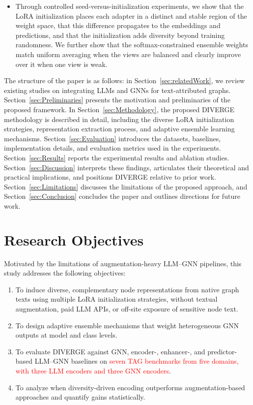 \documentclass[a4paper,fleqn]{cas-sc}
\newcommand{\revone}[1]{\textcolor{red}{#1}}   %
\DeclareRobustCommand{\revcommon}[2][]{\textcolor{revshared}{#2}} %
\begin{document}
\begin{itemize}
	\item \revcommon[R1,R2,R4]{Through controlled seed-versus-initialization experiments, we show that the LoRA initialization places each adapter in a distinct and stable region of the weight space, that this difference propagates to the embeddings and predictions, and that the initialization adds diversity beyond training randomness. We further show that the softmax-constrained ensemble weights match uniform averaging when the views are balanced and clearly improve over it when one view is weak.}
\end{itemize}

The structure of the paper is as follows: in Section~\ref{sec:relatedWork}, we review existing studies on integrating LLMs and GNNs for text-attributed graphs. Section~\ref{sec:Preliminaries} presents the motivation and preliminaries of the proposed framework. In Section~\ref{sec:Methodology}, the proposed DIVERGE methodology is described in detail, including the diverse LoRA initialization strategies, representation extraction process, and adaptive ensemble learning mechanisms. Section~\ref{sec:Evaluation} introduces the datasets, baselines, implementation details, and evaluation metrics used in the experiments. Section~\ref{sec:Results} reports the experimental results and ablation studies. Section~\ref{sec:Discussion} interprets these findings, articulates their theoretical and practical implications, and positions DIVERGE relative to prior work. Section~\ref{sec:Limitations} discusses the limitations of the proposed approach, and Section~\ref{sec:Conclusion} concludes the paper and outlines directions for future work.


\section{Research Objectives}\label{sec:researchObjectives}
Motivated by the limitations of augmentation-heavy LLM--GNN pipelines, this study addresses the following objectives:
\begin{enumerate}
    \item To induce diverse, complementary node representations from native graph texts using multiple LoRA initialization strategies, without textual augmentation, paid LLM APIs, or off-site exposure of sensitive node text.
    \item To design adaptive ensemble mechanisms that weight heterogeneous GNN outputs at model and class levels.
    \item To evaluate DIVERGE against GNN, encoder-, enhancer-, and predictor-based LLM--GNN baselines on \revone{seven TAG benchmarks from five domains, with three LLM encoders and three GNN encoders}.
    \item To analyze when diversity-driven encoding outperforms augmentation-based approaches and quantify gains statistically.
\end{enumerate}
\end{document}
